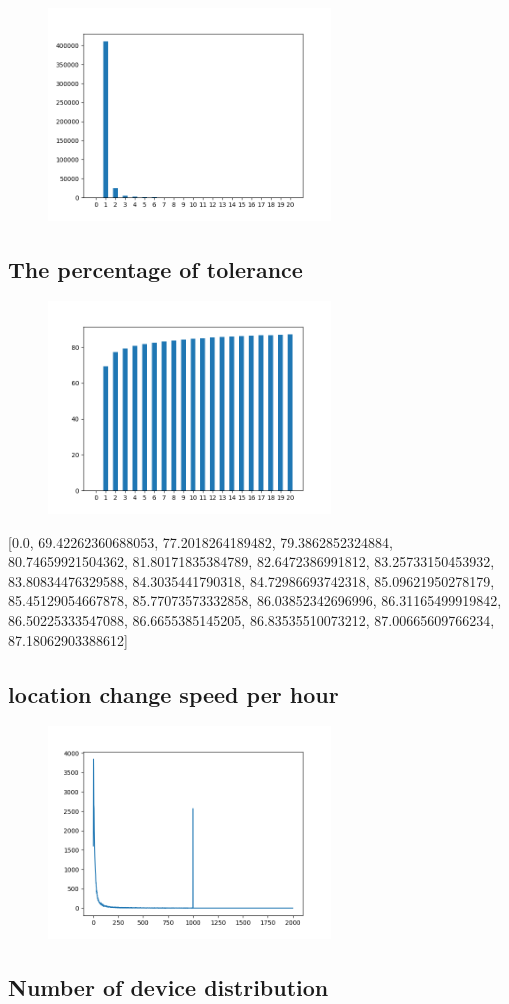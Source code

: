 \documentclass[10pt, conference, compsocconf]{IEEEtran}
\begin{document}
\begin{figure}[H]\centering\includegraphics[width=75mm,scale=0.5]{BasedonClientIDnumberofusersfingerprint}\end{figure}\subsection{The percentage of tolerance}
\begin{figure}[H]\centering\includegraphics[width=75mm,scale=0.5]{BasedonClientIDtolerance}\end{figure}[0.0, 69.42262360688053, 77.2018264189482, 79.3862852324884, 80.74659921504362, 81.80171835384789, 82.6472386991812, 83.25733150453932, 83.80834476329588, 84.3035441790318, 84.72986693742318, 85.09621950278179, 85.45129054667878, 85.77073573332858, 86.03852342696996, 86.31165499919842, 86.50225333547088, 86.6655385145205, 86.83535510073212, 87.00665609766234, 87.18062903388612]\subsection{location change speed per hour}
\begin{figure}[H]\centering\includegraphics[width=75mm,scale=0.5]{BasedonClientIDlocationchange}\end{figure}\subsection{Number of device distribution}
\end{document}
